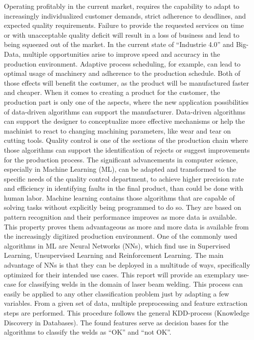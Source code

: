 \documentclass[12pt]{report}
\begin{document}
Operating profitably in the current market, requires the capability to adapt to increasingly individualized customer demands, strict adherence to deadlines, and expected quality requirements. Failure to provide the requested services on time or with unacceptable quality deficit will result in a loss of business and lead to being squeezed out of the market.
\newline
In the current state of “Industrie 4.0” and Big-Data, multiple opportunities arise to improve speed and accuracy in the production environment. Adaptive process scheduling, for example, can lead to optimal usage of machinery and adherence to the production schedule. Both of those effects will benefit the costumer, as the product will be manufactured faster and cheaper. When it comes to creating a product for the customer, the production part is only one of the aspects, where the new application possibilities of data-driven algorithms can support the manufacturer. Data-driven algorithms can support the designer to conceptualize more effective mechanisms or help the machinist to react to changing machining parameters, like wear and tear on cutting tools.
Quality control is one of the sections of the production chain where those algorithms can support the identification of rejects or suggest improvements for the production process. The significant advancements in computer science, especially in Machine Learning (ML), can be adapted and transformed to the specific needs of the quality control department, to achieve higher precision rate and efficiency in identifying faults in the final product, than could be done with human labor.
\newline
Machine learning contains those algorithms that are capable of solving tasks without explicitly being programmed to do so. They are based on pattern recognition and their performance improves as more data is available. This property proves them advantageous as more and more data is available from the increasingly digitized production environment. One of the commonly used algorithms in ML are Neural Networks (NNs), which find use in Supervised Learning, Unsupervised Learning and Reinforcement Learning. The main advantage of NNs is that they can be deployed in a multitude of ways, specifically optimized for their intended use cases.
\newpage
This report will provide an exemplary use-case for classifying welds in the domain of laser beam welding. This process can easily be applied to any other classification problem just by adapting a few variables. From a given set of data, multiple preprocessing and feature extraction steps are performed. This procedure follows the general KDD-process (Knowledge Discovery in Databases).
The found features serve as decision bases for the algorithms to classify the welds as “OK” and “not OK”. 
\end{document}
